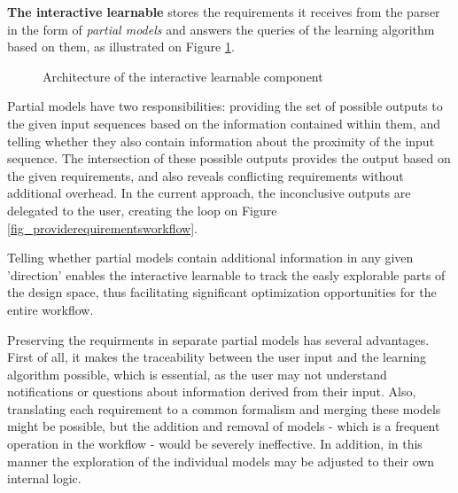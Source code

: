 \textbf{The interactive learnable} stores the requirements it receives from the parser in the form of \textit{partial models} and answers the queries of the learning algorithm based on them, as illustrated on Figure \ref{fig_architcture_interactivelearnable}.

\begin{figure}[!ht] 
	\centering
	\caption{Architecture of the interactive learnable component} 
	\label{fig_architcture_interactivelearnable}
\end{figure}

Partial models have two responsibilities: providing the set of possible outputs to the given input sequences based on the information contained within them, and telling whether they also contain information about the proximity of the input sequence. The intersection of these possible outputs provides the output based on the given requirements, and also reveals conflicting requirements without additional overhead. In the current approach, the inconclusive outputs are delegated to the user, creating the loop on Figure \ref{fig_providerequirementsworkflow}.

Telling whether partial models contain additional information in any given 'direction' enables the interactive learnable to track the easly explorable parts of the design space, thus facilitating significant optimization opportunities for the entire workflow.

Preserving the requirments in separate partial models has several advantages. First of all, it makes the traceability between the user input and the learning algorithm possible, which is essential, as the user may not understand notifications or questions about information derived from their input. Also, translating each requirement to a common formalism and merging these models might be possible, but the addition and removal of models - which is a frequent operation in the workflow - would be severely ineffective. In addition, in this manner the exploration of the individual models may be adjusted to their own internal logic.

